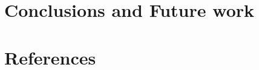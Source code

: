\documentclass[conference]{IEEEtran}
\begin{document}






\section{Conclusions and Future work}


\section{References}


\end{document}
